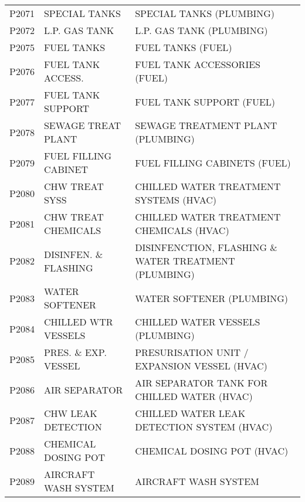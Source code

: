 \begin{longtable}[l]{l%
                  l|%
                  l|}
\rowcolor{thetableheadbgcolor!0.25!white} P2071       & SPECIAL TANKS   & SPECIAL TANKS (PLUMBING)   \\
\rowcolor{thetableheadbgcolor!0.25!white} P2072       & L.P. GAS TANK   & L.P. GAS TANK (PLUMBING)   \\
\rowcolor{thetableheadbgcolor!0.25!white} P2075       & FUEL TANKS   & FUEL TANKS (FUEL)   \\
\rowcolor{thetableheadbgcolor!0.25!white} P2076       & FUEL TANK ACCESS.   & FUEL TANK ACCESSORIES (FUEL)   \\
\rowcolor{thetableheadbgcolor!0.25!white} P2077       & FUEL TANK SUPPORT   & FUEL TANK SUPPORT (FUEL)   \\
\rowcolor{thetableheadbgcolor!0.25!white} P2078       & SEWAGE TREAT PLANT   & SEWAGE TREATMENT PLANT (PLUMBING)   \\
\rowcolor{thetableheadbgcolor!0.25!white} P2079       & FUEL FILLING CABINET   & FUEL FILLING CABINETS (FUEL)   \\
\rowcolor{thetableheadbgcolor!0.25!white} P2080       & CHW TREAT SYSS   & CHILLED WATER TREATMENT SYSTEMS (HVAC)   \\
\rowcolor{thetableheadbgcolor!0.25!white} P2081       & CHW TREAT CHEMICALS   & CHILLED WATER TREATMENT CHEMICALS (HVAC)   \\
\rowcolor{thetableheadbgcolor!0.25!white} P2082       & DISINFEN. \& FLASHING   & DISINFENCTION, FLASHING \& WATER TREATMENT (PLUMBING)   \\
\rowcolor{thetableheadbgcolor!0.25!white} P2083       & WATER SOFTENER   & WATER SOFTENER (PLUMBING)   \\
\rowcolor{thetableheadbgcolor!0.25!white} P2084       & CHILLED WTR VESSELS   & CHILLED WATER VESSELS (PLUMBING)   \\
\rowcolor{thetableheadbgcolor!0.25!white} P2085       & PRES. \& EXP. VESSEL   & PRESURISATION UNIT / EXPANSION VESSEL (HVAC)   \\
\rowcolor{thetableheadbgcolor!0.25!white} P2086       & AIR SEPARATOR   & AIR SEPARATOR TANK FOR CHILLED WATER (HVAC)   \\
\rowcolor{thetableheadbgcolor!0.25!white} P2087       & CHW LEAK DETECTION   & CHILLED WATER LEAK DETECTION SYSTEM (HVAC)   \\
\rowcolor{thetableheadbgcolor!0.25!white} P2088       & CHEMICAL DOSING POT   & CHEMICAL DOSING POT (HVAC)   \\
\rowcolor{thetableheadbgcolor!0.25!white} P2089       & AIRCRAFT WASH SYSTEM   & AIRCRAFT WASH SYSTEM   \\

\end{longtable}
